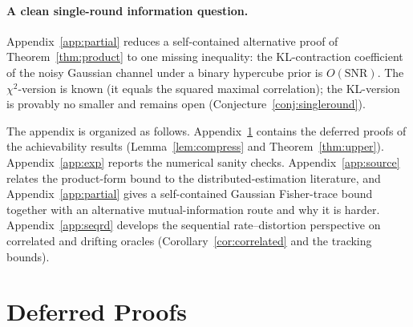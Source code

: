\documentclass[11pt]{article}
\theoremstyle{definition}
\begin{document}
\paragraph{A clean single-round information question.} Appendix~\ref{app:partial} reduces a
self-contained alternative proof of Theorem~\ref{thm:product} to one missing inequality: the
KL-contraction coefficient of the noisy Gaussian channel under a binary hypercube prior is
$O(\mathrm{SNR})$. The $\chi^2$-version is known (it equals the squared maximal correlation); the
KL-version is provably no smaller and remains open
(Conjecture~\ref{conj:singleround}).




\appendix

\noindent The appendix is organized as follows. Appendix~\ref{app:proofs} contains the deferred proofs
of the achievability results (Lemma~\ref{lem:compress} and Theorem~\ref{thm:upper}).
Appendix~\ref{app:exp} reports the numerical sanity checks. Appendix~\ref{app:source} relates the
product-form bound to the distributed-estimation literature, and Appendix~\ref{app:partial} gives a
self-contained Gaussian Fisher-trace bound together with an alternative mutual-information route and
why it is harder. Appendix~\ref{app:seqrd} develops the sequential rate--distortion perspective on
correlated and drifting oracles (Corollary~\ref{cor:correlated} and the tracking bounds).

\section{Deferred Proofs}
\label{app:proofs}
\end{document}
